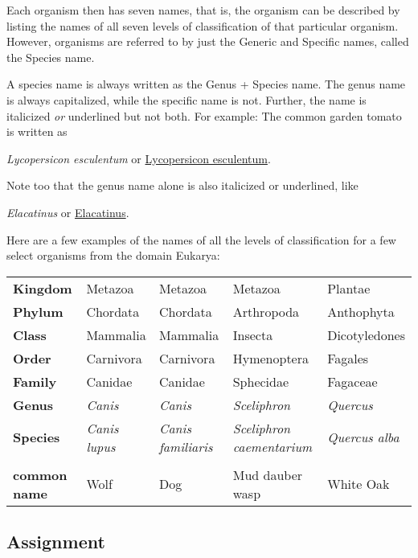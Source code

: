 \documentclass[11pt, addpoints]{exam}
\begin{document}
Each organism then has seven names, that is, the organism can be
described by listing the names of all seven levels of classification of
that particular organism. However, organisms are referred to by just the
Generic and Specific names, called the Species name.

A species name is always written as the Genus + Species name. The genus
name is always capitalized, while the specific name is not. Further, the
name is italicized \emph{or} underlined but not both. For example: The
common garden tomato is written as \vspace{\baselineskip}

\emph{Lycopersicon esculentum} or \uline{Lycopersicon esculentum}.\vspace{\baselineskip}

Note too that the genus name alone is also italicized or underlined, like \vspace{\baselineskip}

\emph{Elacatinus} or \uline{Elacatinus}.\vspace{\baselineskip}

Here are a few examples of the names of all the levels of classification
for a few select organisms from the domain Eukarya:

\begin{longtable}[c]{@{}lllll@{}}
\toprule
\textbf{Kingdom} & Metazoa & Metazoa & Metazoa & Plantae\tabularnewline
\textbf{Phylum} & Chordata & Chordata & Arthropoda &
Anthophyta\tabularnewline
\textbf{Class} & Mammalia & Mammalia & Insecta &
Dicotyledones\tabularnewline
\textbf{Order} & Carnivora & Carnivora & Hymenoptera &
Fagales\tabularnewline
\textbf{Family} & Canidae & Canidae & Sphecidae &
Fagaceae\tabularnewline
\textbf{Genus} & \emph{Canis} & \emph{Canis} & \emph{Sceliphron} &
\emph{Quercus}\tabularnewline
\textbf{Species} & \emph{Canis lupus} & \emph{Canis familiaris} &
\emph{Sceliphron caementarium} & \emph{Quercus alba}\tabularnewline
 & & & &\tabularnewline
\textbf{common name} & Wolf & Dog & Mud dauber wasp & White
Oak\tabularnewline
\bottomrule
\end{longtable}


\subsection*{Assignment}
\end{document}
